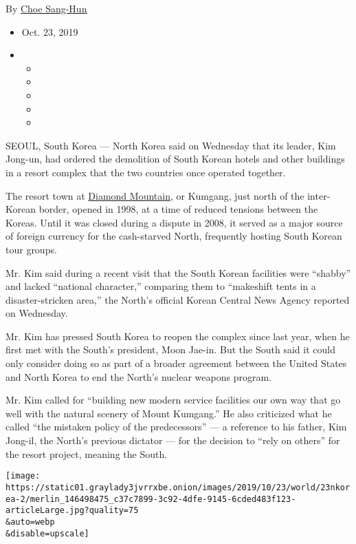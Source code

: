 By \href{https://www.nytimes3xbfgragh.onion/by/choe-sang-hun}{Choe
Sang-Hun}

\begin{itemize}
\item
  Oct. 23, 2019
\item
  \begin{itemize}
  \item
  \item
  \item
  \item
  \item
  \end{itemize}
\end{itemize}

SEOUL, South Korea --- North Korea said on Wednesday that its leader,
Kim Jong-un, had ordered the demolition of South Korean hotels and other
buildings in a resort complex that the two countries once operated
together.

The resort town at
\href{https://www.nytimes3xbfgragh.onion/2006/10/30/world/asia/30iht-mount.3329914.html}{Diamond
Mountain}, or Kumgang, just north of the inter-Korean border, opened in
1998, at a time of reduced tensions between the Koreas. Until it was
closed during a dispute in 2008, it served as a major source of foreign
currency for the cash-starved North, frequently hosting South Korean
tour groups.

Mr. Kim said during a recent visit that the South Korean facilities were
``shabby'' and lacked ``national character,'' comparing them to
``makeshift tents in a disaster-stricken area,'' the North's official
Korean Central News Agency reported on Wednesday.

Mr. Kim has pressed South Korea to reopen the complex since last year,
when he first met with the South's president, Moon Jae-in. But the South
said it could only consider doing so as part of a broader agreement
between the United States and North Korea to end the North's nuclear
weapons program.

Mr. Kim called for ``building new modern service facilities our own way
that go well with the natural scenery of Mount Kumgang.'' He also
criticized what he called ``the mistaken policy of the predecessors''
--- a reference to his father, Kim Jong-il, the North's previous
dictator --- for the decision to ``rely on others'' for the resort
project, meaning the South.

\texttt{[image: https://static01.graylady3jvrrxbe.onion/images/2019/10/23/world/23nkorea-2/merlin\_146498475\_c37c7899-3c92-4dfe-9145-6cded483f123-articleLarge.jpg?quality=75\\\&auto=webp\\\&disable=upscale]}

